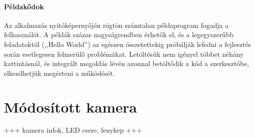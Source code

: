 \paragraph{Példakődok}

Az alkalmazás nyitóképernyőjén rögtön számtalan példaprogram fogadja a felhasználót. A példák százas nagyságrendben érhetők el, és a legegyszerűbb feladatoktól (,,Hello World'') az egészen összetettekig próbálják lefedni a fejlesztés során esetlegesen felmerülő problémákat. Letöltésük nem igényel többet néhány kattintásnál, és integrált megoldás lévén azonnal betöltődik a kód a szerkesztőbe, elkezdhetjük megérteni a működését.

\section{Módosított kamera}\label{sect:infracam}

+++ kamera infok, LED csere, fenykep +++
